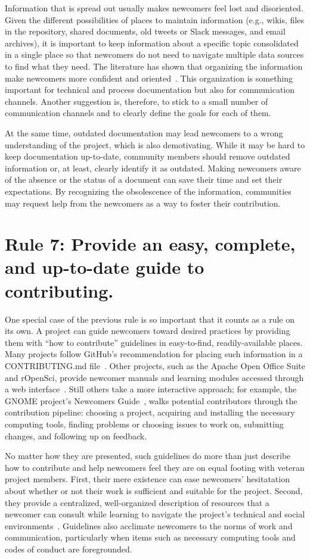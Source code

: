 \documentclass[10pt,letterpaper]{article}
\newcommand{\rulemajor}[1]{\section*{#1}}
\begin{document}
Information that is spread out usually makes newcomers feel lost and disoriented.
Given the different possibilities of places to maintain information
(e.g., wikis, files in the repository, shared documents, old tweets or Slack messages, and email archives),
it is important to keep information about a specific topic consolidated in a single place
so that newcomers do not need to navigate multiple data sources to find what they need.
The literature has shown that organizing the information make newcomers more confident and oriented~\cite{steinmacher2016}.
This organization is something important for technical and process documentation but also for communication channels.
Another suggestion is, therefore, to stick to a small number of communication channels
and to clearly define the goals for each of them.

At the same time,
outdated documentation may lead newcomers to a wrong understanding of the project,
which is also demotivating.
While it may be hard to keep documentation up-to-date,
community members should remove outdated information or, at least, clearly identify it as outdated.
Making newcomers aware of the absence or the status of a document can save their time and set their expectations.
By recognizing the obsolescence of the information,
communities may request help from the newcomers as a way to foster their contribution.

\rulemajor{Rule 7: Provide an easy, complete, and up-to-date guide to contributing.}

One special case of the previous rule is so important that it counts as a rule on its own.
A project can guide newcomers toward desired practices
by providing them with ``how to contribute'' guidelines in easy-to-find, readily-available places.
Many projects follow GitHub's recommendation for placing such information in a CONTRIBUTING.md file~\cite{github-rec}.
Other projects,
such as the Apache Open Office Suite and rOpenSci,
provide newcomer manuals and learning modules accessed through a web interface~\cite{apache-guidelines,ropensci-guidelines}.
Still others take a more interactive approach;
for example,
the GNOME project's Newcomers Guide~\cite{gnome-newcomers}, walks potential contributors through the contribution pipeline:
choosing a project,
acquiring and installing the necessary computing tools,
finding problems or choosing issues to work on,
submitting changes,
and following up on feedback.

No matter how they are presented,
such guidelines do more than just describe how to contribute
and help newcomers feel they are on equal footing with veteran project members.
First,
their mere existence can ease newcomers' hesitatation
about whether or not their work is sufficient and suitable for the project.
Second,
they provide a centralized, well-organized description of resources
that a newcomer can consult while learning to navigate the project's technical and social environments~\cite{zanatta2017}.
Guidelines also acclimate newcomers to the norms of work and communication,
particularly when items such as necessary computing tools and codes of conduct are foregrounded.
\end{document}
